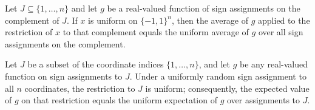 \begin{theorem}
\label{FABL.expect_fixedProjection_signCubeSplitEquiv}
\leanok
{}
Let $J\subseteq\{1,\ldots,n\}$ and let $g$ be a real-valued function of sign assignments
on the complement of $J$. If $x$ is uniform on $\{-1,1\}^n$, then the average of $g$
applied to the restriction of $x$ to that complement equals the uniform average of $g$
over all sign assignments on the complement.
\end{theorem}

\begin{theorem}
\label{FABL.expect_freeProjection_signCubeSplitEquiv}
\leanok
{}
Let $J$ be a subset of the coordinate indices $\{1,\ldots,n\}$, and let $g$ be any
real-valued function on sign assignments to $J$. Under a uniformly random sign
assignment to all $n$ coordinates, the restriction to $J$ is uniform; consequently, the
expected value of $g$ on that restriction equals the uniform expectation of $g$ over
assignments to $J$.
\end{theorem}

